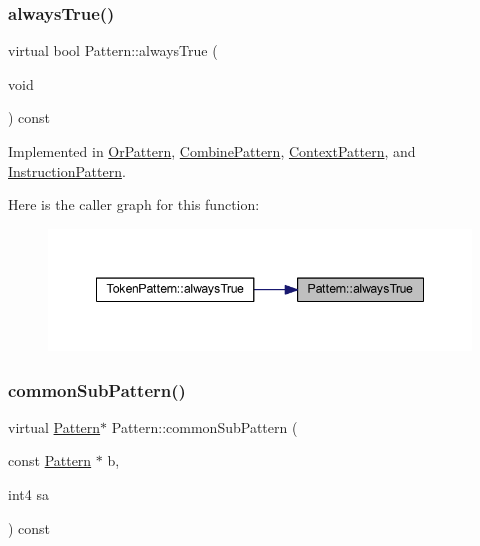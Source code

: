 \subsubsection{\texorpdfstring{alwaysTrue()}{alwaysTrue()}}
{\footnotesize\ttfamily virtual bool Pattern\+::always\+True (\begin{DoxyParamCaption}\item[{void}]{ }\end{DoxyParamCaption}) const\hspace{0.3cm}{\ttfamily [pure virtual]}}



Implemented in \mbox{\hyperlink{class_or_pattern_a22c4506e990fb885136d8684e01bcde1}{Or\+Pattern}}, \mbox{\hyperlink{class_combine_pattern_a2652d809e93e0410daebf2921ad9e04e}{Combine\+Pattern}}, \mbox{\hyperlink{class_context_pattern_aa3a3b46175e110b361f342ad411a2c80}{Context\+Pattern}}, and \mbox{\hyperlink{class_instruction_pattern_a06048b3a010b4822734d34774184f02d}{Instruction\+Pattern}}.

Here is the caller graph for this function\+:
\nopagebreak
\begin{figure}[H]
\begin{center}
\leavevmode
\includegraphics[width=348pt]{class_pattern_ab1527189c63b797a70c23047c033d35f_icgraph}
\end{center}
\end{figure}
\mbox{\label{class_pattern_a54daed6fc84146ad309a25dfa8a68052}} 
\subsubsection{\texorpdfstring{commonSubPattern()}{commonSubPattern()}}
{\footnotesize\ttfamily virtual \mbox{\hyperlink{class_pattern}{Pattern}}$\ast$ Pattern\+::common\+Sub\+Pattern (\begin{DoxyParamCaption}\item[{const \mbox{\hyperlink{class_pattern}{Pattern}} $\ast$}]{b,  }\item[{int4}]{sa }\end{DoxyParamCaption}) const\hspace{0.3cm}{\ttfamily [pure virtual]}}



